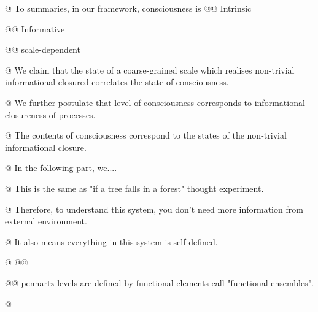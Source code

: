 \documentclass[utf8]{article}
\begin{document}
\begin{WritingMaterials}
        @ To summaries, in our framework, consciousness is 
			    @@ Intrinsic 
			    
			    @@ Informative  
			    
				@@ scale-dependent 

			@ We claim that the state of a coarse-grained scale which realises non-trivial informational closured correlates the state of consciousness.

			@ We further postulate that level of consciousness corresponds to informational closureness of processes.

			@ The contents of consciousness correspond to the states of the non-trivial informational closure.

				
			@ In the following part, we....


			@ This is the same as "if a tree falls in a forest" thought experiment.

			@ Therefore, to understand this system, you don't need more information from external environment.

			@ It also means everything in this system is self-defined.
			
			
			@ 
				@@ 

				@@ pennartz levels are defined by functional elements call "functional ensembles". \cite{pennartz2017consciousness} 

			@  \cite{pennartz2017consciousness}
                

\end{WritingMaterials}
\end{document}
